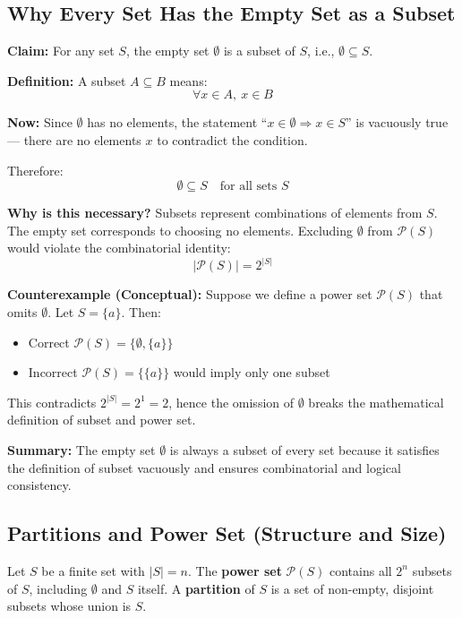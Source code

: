 \documentclass[10pt]{article}
\theoremstyle{plain}
\theoremstyle{definition}
\begin{document}
	
	
	\subsection*{Why Every Set Has the Empty Set as a Subset}
	
	\textbf{Claim:} For any set \( S \), the empty set \( \emptyset \) is a subset of \( S \), i.e., \( \emptyset \subseteq S \).
	
	\textbf{Definition:}  
	A subset \( A \subseteq B \) means:  
	\[
	\forall x \in A,\ x \in B
	\]
	
	\textbf{Now:}  
	Since \( \emptyset \) has no elements, the statement “\( x \in \emptyset \Rightarrow x \in S \)” is vacuously true — there are no elements \( x \) to contradict the condition.
	
	Therefore:
	\[
	\emptyset \subseteq S \quad \text{for all sets } S
	\]
	
	\textbf{Why is this necessary?}  
	Subsets represent combinations of elements from \( S \). The empty set corresponds to choosing no elements. Excluding \( \emptyset \) from \( \mathcal{P}(S) \) would violate the combinatorial identity:
	\[
	|\mathcal{P}(S)| = 2^{|S|}
	\]
	
	\textbf{Counterexample (Conceptual):}  
	Suppose we define a power set \( \mathcal{P}(S) \) that omits \( \emptyset \).  
	Let \( S = \{a\} \). Then:
	\begin{itemize}
		\item Correct \( \mathcal{P}(S) = \{\emptyset, \{a\} \} \)
		\item Incorrect \( \mathcal{P}(S) = \{\{a\}\} \) would imply only one subset
	\end{itemize}
	
	This contradicts \( 2^{|S|} = 2^1 = 2 \), hence the omission of \( \emptyset \) breaks the mathematical definition of subset and power set.
	
	\textbf{Summary:}  
	The empty set \( \emptyset \) is always a subset of every set because it satisfies the definition of subset vacuously and ensures combinatorial and logical consistency.
	
	\subsection*{Partitions and Power Set (Structure and Size)}
	
	Let $S$ be a finite set with $|S| = n$. The \textbf{power set} $\mathcal{P}(S)$ contains all $2^n$ subsets of $S$, including $\emptyset$ and $S$ itself. A \textbf{partition} of $S$ is a set of non-empty, disjoint subsets whose union is $S$.
	
\end{document}
